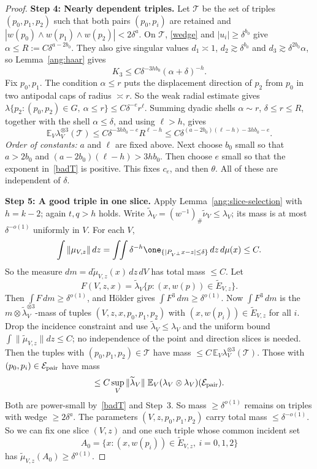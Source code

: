 \documentclass[11pt,reqno]{amsart}
\begin{document}
\begin{proof}
\textbf{Step 4: Nearly dependent triples.} Let $\mathcal T$ be the set of triples $(p_0,p_1,p_2)$ such that both pairs $(p_0,p_i)$ are retained and $|w(p_0)\wedge w(p_1)\wedge w(p_2)|<2\delta^a$. On $\mathcal T$, \eqref{wedge} and $|u_i|\ge\delta^{b_0}$ give $\alpha\le R:=C\delta^{a-2b_0}$. They also give singular values $d_1\asymp1$, $d_2\gtrsim\delta^{b_0}$ and $d_3\gtrsim\delta^{2b_0}\alpha$, so Lemma~\ref{ang:haar} gives
\[
K_3\le C\delta^{-3hb_0}(\alpha+\delta)^{-h}.
\]
Fix $p_0,p_1$. The condition $\alpha\le r$ puts the displacement direction of $p_2$ from $p_0$ in two antipodal caps of radius $\asymp r$. So the weak radial estimate gives $\lambda\{p_2:(p_0,p_2)\in G,\ \alpha\le r\}\le C\delta^{-e}r^\ell$. Summing dyadic shells $\alpha\sim r$, $\delta\le r\le R$, together with the shell $\alpha\le\delta$, and using $\ell>h$, gives
\begin{equation}\label{badT}
\mathbb E_V\lambda_V^{\otimes3}(\mathcal T)\le C\delta^{-3hb_0-e}R^{\ell-h}\le C\delta^{(a-2b_0)(\ell-h)-3hb_0-e}.
\end{equation}
\emph{Order of constants:} $a$ and $\ell$ are fixed above. Next choose $b_0$ small so that $a>2b_0$ and $(a-2b_0)(\ell-h)>3hb_0$. Then choose $e$ small so that the exponent in~\eqref{badT} is positive. This fixes $c_e$, and then $\theta$. All of these are independent of $\delta$.

\textbf{Step 5: A good triple in one slice.} Apply Lemma~\ref{ang:slice-selection} with $h=k-2$; again $t,q>h$ holds. Write $\widetilde\lambda_V=(w^{-1})_\#\widetilde\nu_V\le\lambda_V$; its mass is at most $\delta^{-o(1)}$ uniformly in $V$. For each $V$,
\[
\int\|\mu_{V,z}\|\,dz=\int\!\!\int\delta^{-h}\one_{\{|P_{V^\perp}x-z|\le\delta\}}\,dz\,d\mu(x)\le C .
\]
So the measure $dm=d\widetilde\mu_{V,z}(x)\,dz\,dV$ has total mass $\le C$. Let
\[
F(V,z,x)=\widetilde\lambda_V\{p:(x,w(p))\in\widetilde E_{V,z}\}.
\]
Then $\int F\,dm\ge\delta^{o(1)}$, and H\"older gives $\int F^3\,dm\ge\delta^{o(1)}$. Now $\int F^3\,dm$ is the $m\otimes\widetilde\lambda_V^{\otimes3}$-mass of tuples $(V,z,x,p_0,p_1,p_2)$ with $(x,w(p_i))\in\widetilde E_{V,z}$ for all $i$. Drop the incidence constraint and use $\widetilde\lambda_V\le\lambda_V$ and the uniform bound $\int\|\widetilde\mu_{V,z}\|dz\le C$; no independence of the point and direction slices is needed. Then the tuples with $(p_0,p_1,p_2)\in\mathcal T$ have mass $\le C\,\mathbb E_V\lambda_V^{\otimes3}(\mathcal T)$. Those with $(p_0,p_i)\in\mathcal E_{\rm pair}$ have mass
\[
\le C\sup_V\|\widetilde\lambda_V\|\;\mathbb E_V(\lambda_V\otimes\lambda_V)(\mathcal E_{\rm pair}).
\]
Both are power-small by~\eqref{badT} and Step~3. So mass $\ge\delta^{o(1)}$ remains on triples with wedge $\ge2\delta^a$. The parameters $(V,z,p_0,p_1,p_2)$ carry total mass $\le\delta^{-o(1)}$. So we can fix one slice $(V,z)$ and one such triple whose common incident set
\[
A_0=\{x:(x,w(p_i))\in\widetilde E_{V,z},\ i=0,1,2\}
\]
has $\widetilde\mu_{V,z}(A_0)\ge\delta^{o(1)}$.


\end{proof}
\end{document}
